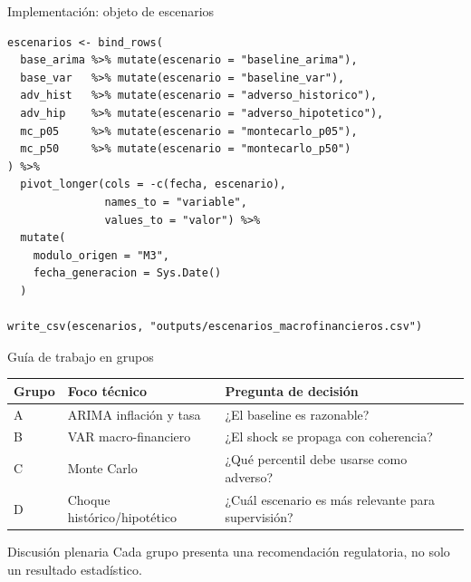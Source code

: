 \documentclass[10pt,aspectratio=169]{beamer}
\begin{document}
\begin{frame}[fragile]{Implementación: objeto de escenarios}
\begin{lstlisting}
escenarios <- bind_rows(
  base_arima %>% mutate(escenario = "baseline_arima"),
  base_var   %>% mutate(escenario = "baseline_var"),
  adv_hist   %>% mutate(escenario = "adverso_historico"),
  adv_hip    %>% mutate(escenario = "adverso_hipotetico"),
  mc_p05     %>% mutate(escenario = "montecarlo_p05"),
  mc_p50     %>% mutate(escenario = "montecarlo_p50")
) %>%
  pivot_longer(cols = -c(fecha, escenario),
               names_to = "variable",
               values_to = "valor") %>%
  mutate(
    modulo_origen = "M3",
    fecha_generacion = Sys.Date()
  )

write_csv(escenarios, "outputs/escenarios_macrofinancieros.csv")
\end{lstlisting}
\end{frame}

\begin{frame}{Guía de trabajo en grupos}
\begin{table}
\small
\begin{tabular}{p{2.7cm}p{4.2cm}p{4.2cm}}
\toprule
Grupo & Foco técnico & Pregunta de decisión \\
\midrule
A & ARIMA inflación y tasa & ¿El baseline es razonable? \\
B & VAR macro-financiero & ¿El shock se propaga con coherencia? \\
C & Monte Carlo & ¿Qué percentil debe usarse como adverso? \\
D & Choque histórico/hipotético & ¿Cuál escenario es más relevante para supervisión? \\
\bottomrule
\end{tabular}
\end{table}

\begin{block}{Discusión plenaria}
Cada grupo presenta una recomendación regulatoria, no solo un resultado estadístico.
\end{block}
\end{frame}
\end{document}
